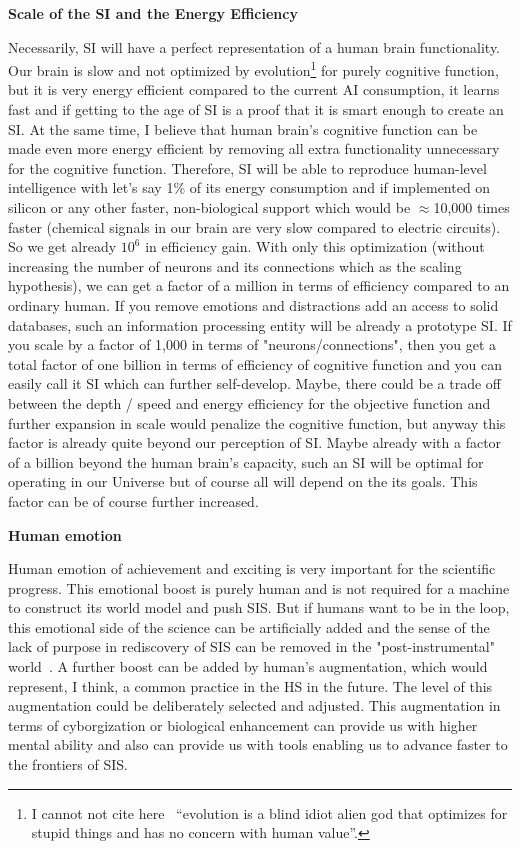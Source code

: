 \documentclass[a4paper,11pt]{article}
\begin{document}
\textbf{Scale of the SI and the Energy Efficiency}

Necessarily, SI will have a perfect representation of a human brain functionality. Our brain is slow and not optimized by evolution\footnote{I cannot not cite here~\textcite{Scott2014Moloch} ``evolution is a blind idiot alien god that optimizes for stupid things and has no concern with human value''.} for purely cognitive function, but it is very energy efficient compared to the current AI consumption, it learns fast and if getting to the age of SI is a proof that it is smart enough to create an SI. At the same time, I believe that human brain's cognitive function can be made even more energy efficient by removing all extra functionality unnecessary for the cognitive function. Therefore, SI will be able to reproduce human-level intelligence with let's say 1\% of its energy consumption and if implemented on silicon or any other faster, non-biological support which would be $\approx$10,000 times faster (chemical signals in our brain are very slow compared to electric circuits). So we get already $10^6$ in efficiency gain.
With only this optimization (without increasing the number of neurons and its connections which as the scaling hypothesis), we can get a factor of a million in terms of efficiency compared to an ordinary human. If you remove emotions and distractions add an access to solid databases, such an information processing entity will be already a prototype SI. If you scale by a factor of 1,000 in terms of "neurons/connections", then you get a total factor of one billion in terms of efficiency of cognitive function and you can easily call it SI which can further self-develop. Maybe, there could be a trade off between the depth / speed and energy efficiency for the objective function and further expansion in scale would penalize the cognitive function, but anyway this factor is already quite beyond our perception of SI. Maybe already with a factor of a billion beyond the human brain's capacity, such an SI will be optimal for operating in our Universe but of course all will depend on the its goals. This factor can be of course further increased.

\textbf{Human emotion}

Human emotion of achievement and exciting is very important for the scientific progress. This emotional boost is purely human and is not required for a machine to construct its world model and push SIS. But if humans want to be in the loop, this emotional side of the science can be artificially added and the sense of the lack of purpose in rediscovery of SIS can be removed in the "post-instrumental" world~\parencite{DeepUtopia}. A further boost can be added by human's augmentation, which would represent, I think, a common practice in the HS in the future. The level of this augmentation could be deliberately selected and adjusted. This augmentation in terms of cyborgization or biological enhancement can provide us with higher mental ability and also can provide us with tools enabling us to advance faster to the frontiers of SIS.
\end{document}
